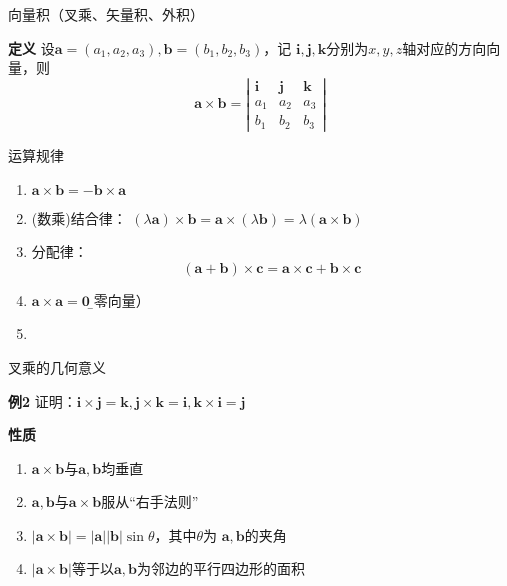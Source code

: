 \begin{frame}{向量积（叉乘、矢量积、外积）}
	\linespread{1.2}
	\begin{block}{{\bf 定义}\hfill}
		设$\bm{a}=(a_1,a_2,a_3),\bm{b}=(b_1,b_2,b_3)$，\pause 记
		$\bm{i},\bm{j},\bm{k}$分别为$x,y,z$轴对应的方向向量，\pause 则
		$$\bm{a}\times\bm{b}=\left|\begin{array}{ccc}
		\bm{i} & \bm{j} & \bm{k}\\
		a_1 & a_2 & a_3\\
		b_1 & b_2 & b_3
		\end{array}\right|$$
	\end{block}
	
\end{frame}

\begin{frame}{运算规律}
	\linespread{1.2}
	\begin{enumerate}\pause 
	  \item {}$\bm{a}\times\bm{b}=-\bm{b}\times\bm{a}$\pause 
	  \item (数乘)结合律：
	  $(\lambda\bm{a})\times\bm{b}=\bm{a}\times(\lambda\bm{b})
	  =\lambda(\bm{a}\times\bm{b})$\pause
	  \item 分配律：
	  $$(\bm{a}+\bm{b})\times\bm{c}=\bm{a}\times\bm{c}+\bm{b}\times\bm{c}$$\pause
	  \vspace{-3ex} 
	  \item \alert{$\bm{a}\times\bm{a}=\bm{0}$}{\b （零向量）}\pause 
	  \item {}
	\end{enumerate}
\end{frame}

\begin{frame}{叉乘的几何意义}
	\linespread{1.2}\pause 
	\begin{exampleblock}{{\bf 例2}\hfill}
		证明：$\bm{i}\times\bm{j}=\bm{k},\bm{j}\times\bm{k}=\bm{i},
		\bm{k}\times\bm{i}=\bm{j}$
	\end{exampleblock}
	\pause 
	\bigskip
	\begin{block}{{\bf 性质}\hfill}
		\begin{enumerate}
		  \item $\bm{a}\times\bm{b}$与$\bm{a},\bm{b}$均垂直\pause 
		  \item $\bm{a},\bm{b}$与$\bm{a}\times\bm{b}$服从\alert{“右手法则”}\pause 
		  \item $|\bm{a}\times\bm{b}|=|\bm{a}||\bm{b}|\sin\theta$，其中$\theta$为
		  $\bm{a},\bm{b}$的夹角\pause 
		  \item $|\bm{a}\times\bm{b}|$等于以$\bm{a},\bm{b}$为邻边的平行四边形的面积
		\end{enumerate}
	\end{block}
\end{frame}

